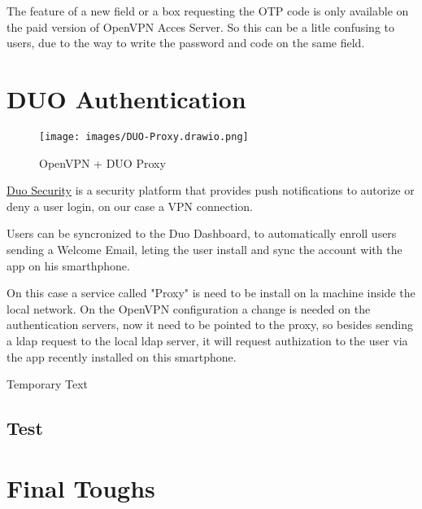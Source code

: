 The feature of a new field or a box requesting the OTP code is only available on the paid version of OpenVPN Acces Server.
So this can be a litle confusing to users, due to the way to write the password and code on the same field.




\newpage
\section{DUO Authentication}

\begin{figure}[!h]
  \centering
  \texttt{[image: images/DUO-Proxy.drawio.png]}
  \caption{OpenVPN + DUO Proxy}
  \label{fig:label}
\end{figure}

\href{https://duo.com/}{Duo Security} is a security platform that provides push notifications to autorize or deny a user login, on our case a VPN connection.

Users can be syncronized to the Duo Dashboard, to automatically enroll users sending a Welcome Email, leting the user install and sync the account with the app on his smarthphone.

On this case a service called "Proxy" is need to be install on la machine inside the local network. On the OpenVPN configuration a change is needed on the authentication servers, now it need to be pointed to the proxy, so besides sending a ldap request to the local ldap server, it will request authization to the user via the app recently installed on this smartphone.

Temporary Text



\subsection{Test}


\newpage
\section{Final Toughs}
